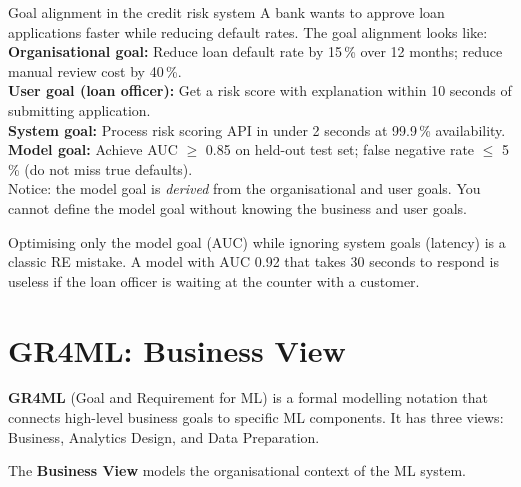 \documentclass[a4paper,11pt]{article}
\newcommand{\vocab}[1]{\textbf{\color{navy}#1}}
\begin{document}
\begin{worked}{Goal alignment in the credit risk system}
A bank wants to approve loan applications faster while reducing default rates. The goal alignment looks like: \\[4pt]
\textbf{Organisational goal:} Reduce loan default rate by 15\,\% over 12 months; reduce manual review cost by 40\,\%. \\
\textbf{User goal (loan officer):} Get a risk score with explanation within 10 seconds of submitting application. \\
\textbf{System goal:} Process risk scoring API in under 2 seconds at 99.9\,\% availability. \\
\textbf{Model goal:} Achieve AUC $\geq$ 0.85 on held-out test set; false negative rate $\leq$ 5\,\% (do not miss true defaults). \\[4pt]
Notice: the model goal is \emph{derived} from the organisational and user goals. You cannot define the model goal without knowing the business and user goals.
\end{worked}

\begin{watchout}
Optimising only the model goal (AUC) while ignoring system goals (latency) is a classic RE mistake. A model with AUC 0.92 that takes 30 seconds to respond is useless if the loan officer is waiting at the counter with a customer.
\end{watchout}

\section{GR4ML: Business View}

\vocab{GR4ML} (Goal and Requirement for ML) is a formal modelling notation that connects high-level business goals to specific ML components. It has three views: Business, Analytics Design, and Data Preparation.

The \vocab{Business View} models the organisational context of the ML system.
\end{document}
